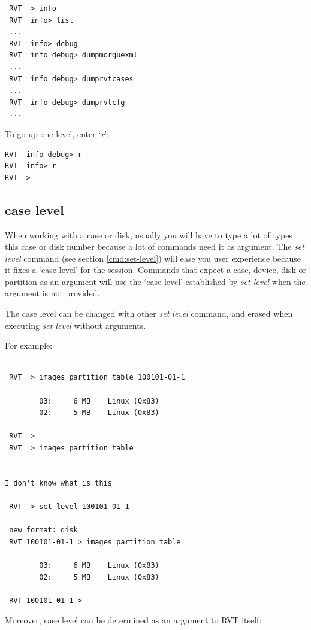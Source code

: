 \documentclass[a4paper,11pt,oneside]{report}
\begin{document}
\begin{verbatim}
 RVT  > info 
 RVT  info> list
 ...  
 RVT  info> debug
 RVT  info debug> dumpmorguexml
 ...
 RVT  info debug> dumprvtcases
 ...
 RVT  info debug> dumprvtcfg
 ...
\end{verbatim}


To go up one level, enter `\emph{r}':

\begin{verbatim}
RVT  info debug> r
RVT  info> r
RVT  > 
\end{verbatim}


\subsection{case level}

When working with a case or disk, usually you will have to type a lot of types this case or disk number because a lot of commands need it as argument. The \emph{set level} command (see section \ref{cmd:set-level}) will ease you user experience because it fixes a `case level' for the session. Commands that expect a case, device, disk or partition as an argument will use the `case level' established by \emph{set level} when the argument is not provided. 

The case level can be changed with other \emph{set level} command, and erased when executing \emph{set level} without arguments.

For example:

\begin{verbatim}

 RVT  > images partition table 100101-01-1                                    

        03:     6 MB    Linux (0x83)
        02:     5 MB    Linux (0x83)

 RVT  > 
 RVT  > images partition table


I don't know what is this

 RVT  > set level 100101-01-1                                                 

 new format: disk
 RVT 100101-01-1 > images partition table                                     

        03:     6 MB    Linux (0x83)
        02:     5 MB    Linux (0x83)

 RVT 100101-01-1 > 
\end{verbatim}


Moreover, case level can be determined as an argument to RVT itself:
\end{document}
